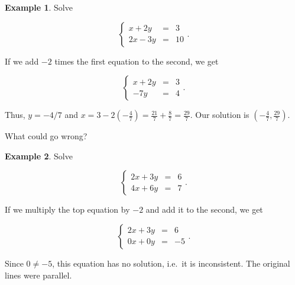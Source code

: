 \documentclass[
]{book}
\theoremstyle{definition}
\theoremstyle{definition}
\newtheorem{example}{Example}[chapter]
\theoremstyle{definition}
\theoremstyle{definition}
\theoremstyle{remark}
\begin{document}
\begin{examplebox}

\begin{example}
Solve

\begin{equation*}
\left\{
\begin{array}{ccl}
x+2y&=&3\\
    2x-3y&=&10
\end{array}\right. .
\end{equation*}

If we add \(-2\) times the first equation to the second, we get

\begin{equation*}
\left\{
\begin{array}{rcl}
x+2y&=&3\\
    -7y&=&4
\end{array}\right. .
\end{equation*}

Thus, \(y=-4/7\) and \(x=3-2\left(-\frac{4}{7}\right)=\frac{21}{7}+\frac{8}{7}=\frac{29}{7}.\) Our solution is \(\left(-\frac{4}{7},\frac{29}{7}\right).\)
\end{example}

\end{examplebox}

What could go wrong?

\begin{examplebox}

\begin{example}
Solve

\begin{equation*}
\left\{
\begin{array}{ccl}
2x+3y&=&6\\
    4x+6y&=&7
\end{array}\right. .
\end{equation*}

If we multiply the top equation by \(-2\) and add it to the second, we get

\begin{equation*}
\left\{
\begin{array}{ccl}
2x+3y&=&6\\
    0x+0y&=&-5
\end{array}\right. .
\end{equation*}

Since \(0\neq -5\), this equation has no solution, i.e.~it is inconsistent. The original lines were parallel.
\end{example}

\end{examplebox}
\end{document}
